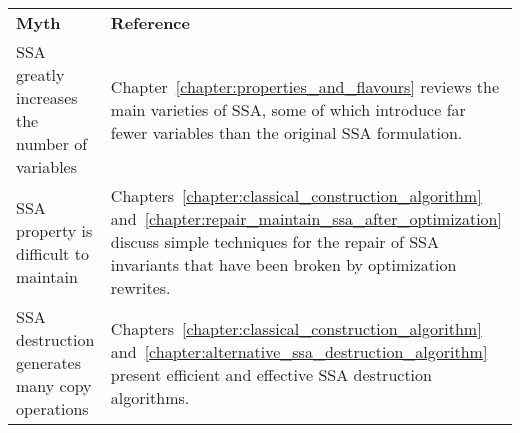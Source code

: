 \begin{center}
\small
\begin{tabular}{p{}@{\kern.05\textwidth}@{\kern.05\textwidth}p{}}
  \hfil \textbf{Myth}\hfil & \hfil \textbf{Reference} \hfil \\[2ex]%
\hspace{.39\textwidth}\penalty0
SSA greatly increases the number of variables &
Chapter~\ref{chapter:properties_and_flavours} reviews the main varieties of
SSA, some of which introduce far fewer variables
than the original SSA formulation. \\ [1ex]
\hspace{.39\textwidth}\penalty0 SSA property is difficult to maintain & 
Chapters~\ref{chapter:classical_construction_algorithm} and~\ref{chapter:repair_maintain_ssa_after_optimization}  discuss simple techniques 
for the repair of SSA invariants that have been
broken by optimization rewrites.\\ [1ex]
SSA destruction generates many copy operations & 
Chapters~\ref{chapter:classical_construction_algorithm} and~\ref{chapter:alternative_ssa_destruction_algorithm} present efficient and effective SSA destruction algorithms. \\
\end{tabular}
\end{center}

